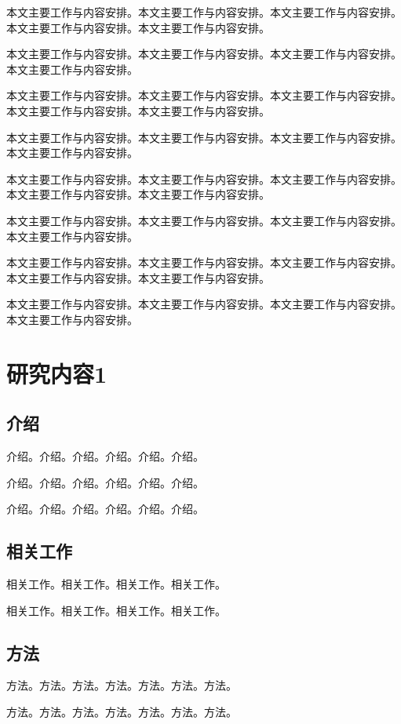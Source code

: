 \documentclass{csuthesis}
\begin{document}
    本文主要工作与内容安排。本文主要工作与内容安排。本文主要工作与内容安排。本文主要工作与内容安排。本文主要工作与内容安排。

    本文主要工作与内容安排。本文主要工作与内容安排。本文主要工作与内容安排。本文主要工作与内容安排。
    
    本文主要工作与内容安排。本文主要工作与内容安排。本文主要工作与内容安排。本文主要工作与内容安排。本文主要工作与内容安排。
    
    本文主要工作与内容安排。本文主要工作与内容安排。本文主要工作与内容安排。本文主要工作与内容安排。
    
    本文主要工作与内容安排。本文主要工作与内容安排。本文主要工作与内容安排。本文主要工作与内容安排。本文主要工作与内容安排。
    
    本文主要工作与内容安排。本文主要工作与内容安排。本文主要工作与内容安排。本文主要工作与内容安排。
    
    本文主要工作与内容安排。本文主要工作与内容安排。本文主要工作与内容安排。本文主要工作与内容安排。本文主要工作与内容安排。
    
    本文主要工作与内容安排。本文主要工作与内容安排。本文主要工作与内容安排。本文主要工作与内容安排。

    \chapter{研究内容1}
    \thispagestyle{mainstyle} %
    \section{介绍}
    介绍。介绍。介绍。介绍。介绍。介绍。

    介绍。介绍。介绍。介绍。介绍。介绍。

    介绍。介绍。介绍。介绍。介绍。介绍。

    \section{相关工作}
    相关工作。相关工作。相关工作。相关工作。

    相关工作。相关工作。相关工作。相关工作。

    \section{方法}
    方法。方法。方法。方法。方法。方法。方法。

    方法。方法。方法。方法。方法。方法。方法。
\end{document}
